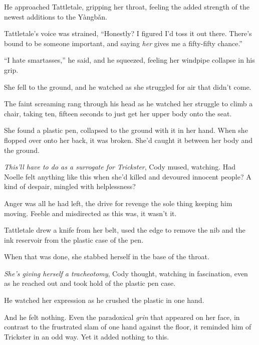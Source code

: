 He approached Tattletale, gripping her throat, feeling the added strength of the newest additions to the Y\`{a}ngb\v{a}n.



Tattletale's voice was strained, ``Honestly?  I figured I'd toss it out there.  There's bound to be someone important, and saying \emph{her} gives me a fifty-fifty chance.''



``I hate smartasses,'' he said, and he squeezed, feeling her windpipe collapse in his grip.



She fell to the ground, and he watched as she struggled for air that didn't come.



The faint screaming rang through his head as he watched her struggle to climb a chair, taking ten, fifteen seconds to just get her upper body onto the seat.



She found a plastic pen, collapsed to the ground with it in her hand.  When she flopped over onto her back, it was broken.  She'd caught it between her body and the ground.



\emph{This'll have to do as a surrogate for Trickster}, Cody mused, watching.  Had Noelle felt anything like this when she'd killed and devoured innocent people?  A kind of despair, mingled with helplessness?



Anger was all he had left, the drive for revenge the sole thing keeping him moving.  Feeble and misdirected as this was, it wasn't it.



Tattletale drew a knife from her belt, used the edge to remove the nib and the ink reservoir from the plastic case of the pen.



When that was done, she stabbed herself in the base of the throat.



\emph{She's giving herself a tracheotomy}, Cody thought, watching in fascination, even as he reached out and took hold of the plastic pen case.



He watched her expression as he crushed the plastic in one hand.



And he felt nothing.  Even the paradoxical \emph{grin} that appeared on her face, in contrast to the frustrated slam of one hand against the floor, it reminded him of Trickster in an odd way.  Yet it added nothing to this.




